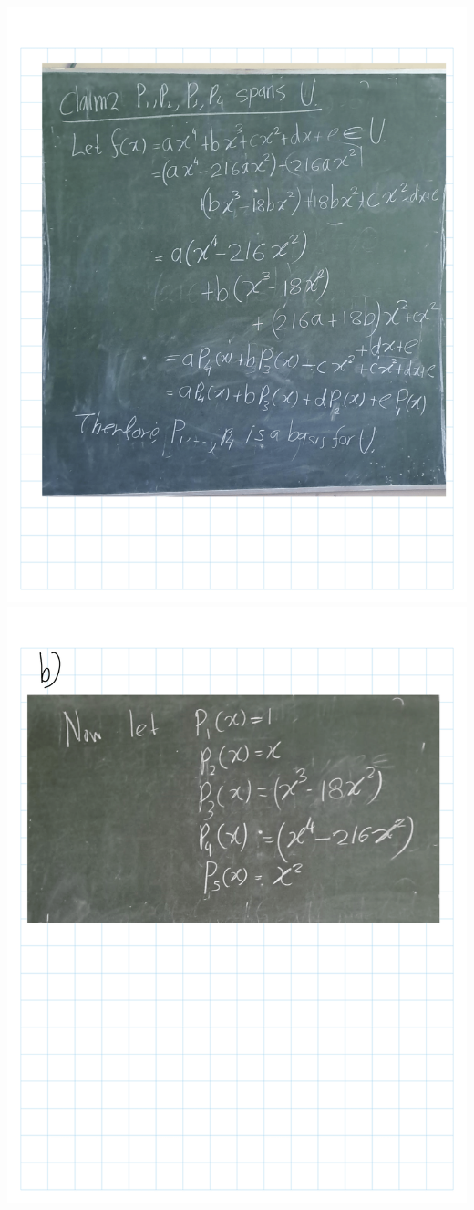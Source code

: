 \documentclass[
]{book}
\theoremstyle{definition}
\theoremstyle{definition}
\theoremstyle{definition}
\theoremstyle{definition}
\theoremstyle{remark}
\begin{document}
\includegraphics{fig/Ex 2B and 2C/Ex 2c (16).png}
\includegraphics{fig/Ex 2B and 2C/Ex 2c (17).png}
\end{document}
